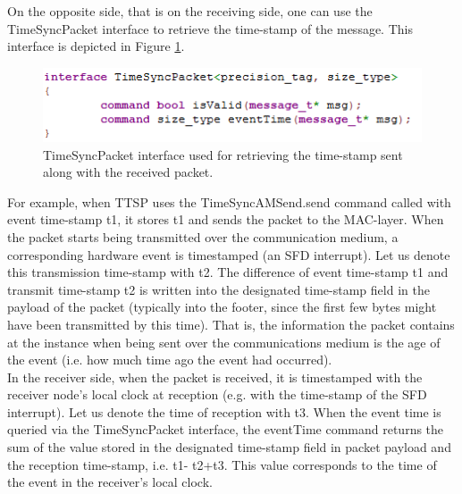 On the opposite side, that is on the receiving side, one can use the TimeSyncPacket interface to retrieve the time-stamp of the message. This interface is depicted in Figure \ref{timesyncpacket}.

\begin{figure}[!htb]
\begin{center}
\includegraphics[scale=0.5]{./images/32-ttsp-mac_timestamp2.png}
\end{center}
\caption{TimeSyncPacket interface used for retrieving the time-stamp sent along with the received packet.}
\label{timesyncpacket}
\end{figure}
 
For example, when TTSP uses the TimeSyncAMSend.send command called with event time-stamp t1, it stores t1 and sends the packet to the MAC-layer. When the packet starts being transmitted over the communication medium, a corresponding hardware event is timestamped (an SFD interrupt). Let us denote this transmission time-stamp with t2. The difference of event time-stamp t1 and transmit time-stamp t2 is written into the designated time-stamp field in the payload of the packet (typically into the footer, since the first few bytes might have been transmitted by this time). That is, the information the packet contains at the instance when being sent over the communications medium is the age of the event (i.e. how much time ago the event had occurred).\\
In the receiver side, when the packet is received, it is timestamped with the receiver node's local clock at reception (e.g. with the time-stamp of the SFD interrupt). Let us denote the time of reception with t3. When the event time is queried via the TimeSyncPacket interface, the eventTime command returns the sum of the value stored in the designated time-stamp field in packet payload and the reception time-stamp, i.e. t1- t2+t3. This value corresponds to the time of the event in the receiver's local clock.


